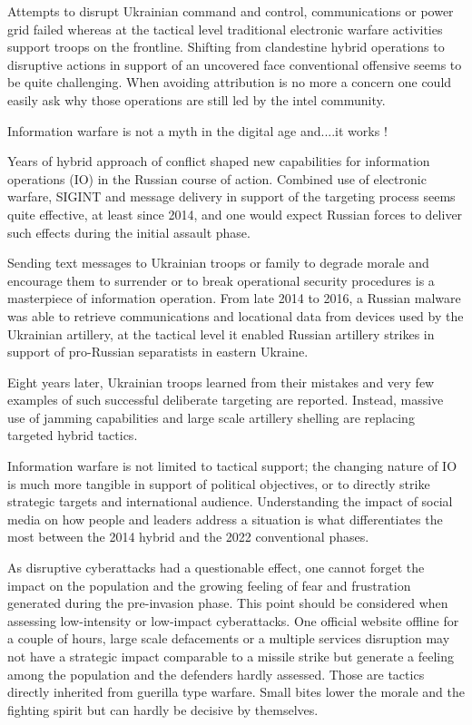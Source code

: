 Attempts to disrupt Ukrainian command and control, communications or power grid failed whereas at the tactical level traditional electronic warfare activities support troops on the frontline. Shifting from clandestine hybrid operations to disruptive actions in support of an uncovered face conventional offensive seems to be quite challenging. When avoiding attribution is no more a concern one could easily ask why those operations are still led by the intel community.

Information warfare is not a myth in the digital age and....it works !

Years of hybrid approach of conflict shaped new capabilities for information operations (IO) in the Russian course of action. Combined use of electronic warfare, SIGINT and message delivery in support of the targeting process seems quite effective, at least since 2014, and one would expect Russian forces to deliver such effects during the initial assault phase.

Sending text messages to Ukrainian troops or family to degrade morale and encourage them to surrender or to break operational security procedures is a masterpiece of information operation. From late 2014 to 2016, a Russian malware was able to retrieve communications and locational data from devices used by the Ukrainian artillery, at the tactical level it enabled Russian artillery strikes in support of pro-Russian separatists in eastern Ukraine.

Eight years later, Ukrainian troops learned from their mistakes and very few examples of such successful deliberate targeting are reported. Instead, massive use of jamming capabilities and large scale artillery shelling are replacing targeted hybrid tactics.

Information warfare is not limited to tactical support; the changing nature of IO is much more tangible in support of political objectives, or to directly strike strategic targets and international audience. Understanding the impact of social media on how people and leaders address a situation is what differentiates the most between the 2014 hybrid and the 2022 conventional phases. 

As disruptive cyberattacks had a questionable effect, one cannot forget the impact on the population and the growing feeling of fear and frustration generated during the pre-invasion phase. This point should be considered when assessing low-intensity or low-impact cyberattacks. One official website offline for a couple of hours, large scale defacements or a multiple services disruption may not have a strategic impact comparable to a missile strike but generate a feeling among the population and the defenders hardly assessed. Those are tactics directly inherited from guerilla type warfare. Small bites lower the morale and the fighting spirit but can hardly be decisive by themselves.

